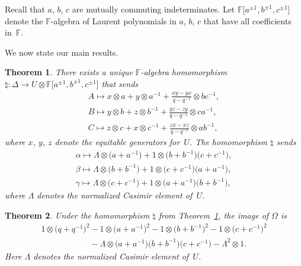 \documentclass[11pt]{article}
\numberwithin{equation}{section}
\newtheorem{Theorem}{Theorem}[section]
\begin{document}
Recall that $a$, $b$, $c$ are mutually commuting indeterminates.
Let
$\mathbb F \lbrack a^{\pm 1}, b^{\pm 1}, c^{\pm 1}\rbrack$
denote the $\mathbb F$-algebra
of Laurent polynomials in
$a$, $b$, $c$ that have all coef\/f\/icients in~$\mathbb F$.

We now state our main results.


\begin{Theorem}\label{thm:main}
There exists a unique  $\mathbb F$-algebra homomorphism
$\natural: \Delta \to
U \otimes
\mathbb F \lbrack a^{\pm 1}, b^{\pm 1}, c^{\pm 1}\rbrack
$ that sends
\begin{gather*}
A  \mapsto   x \otimes a + y \otimes a^{-1} +
\frac{x y - y x}{q-q^{-1}} \otimes b c^{-1},
\\
B \mapsto  y \otimes b + z \otimes b^{-1} +
\frac{y z - z y}{q-q^{-1}} \otimes c a^{-1},
\\
C \mapsto  z \otimes c + x \otimes c^{-1} +
\frac{z x - x z}{q-q^{-1}} \otimes a b^{-1},
\end{gather*}
where $x$, $y$, $z$ denote the equitable generators for~$U$.
The homomorphism $\natural$ sends
\begin{gather}
\alpha  \mapsto  \Lambda \otimes \big(a+a^{-1}\big) + 1\otimes \big(b+b^{-1}\big)\big(c+c^{-1}\big),
\label{eq:alsend}
\\
\beta  \mapsto  \Lambda \otimes \big(b+b^{-1}\big) + 1 \otimes \big(c+c^{-1}\big)\big(a+a^{-1}\big),
\label{eq:besend}
\\
\gamma  \mapsto  \Lambda \otimes \big(c+c^{-1}\big) + 1 \otimes \big(a+a^{-1}\big)\big(b+b^{-1}\big),
\label{eq:gasend}
\end{gather}
where $\Lambda $ denotes the normalized Casimir element of~$U$.
\end{Theorem}


\begin{Theorem}\label{thm:main2}
Under the homomorphism
$\natural$
from Theorem~{\rm \ref{thm:main}}, the image of
$\Omega$ is
\begin{gather}
1 \otimes \big(q+q^{-1}\big)^2
-
1\otimes \big(a+a^{-1}\big)^2
-
1\otimes \big(b+b^{-1}\big)^2
-
1 \otimes \big(c+c^{-1}\big)^2
\nonumber\\
\phantom{1 \otimes \big(q+q^{-1}\big)^2}{}
-\Lambda \otimes \big(a+a^{-1}\big)\big(b+b^{-1}\big)\big(c+c^{-1}\big)
- \Lambda ^2 \otimes 1.\label{eq:omimage}
\end{gather}
Here $\Lambda$ denotes the normalized Casimir element
of~$U$.
\end{Theorem}
\end{document}
